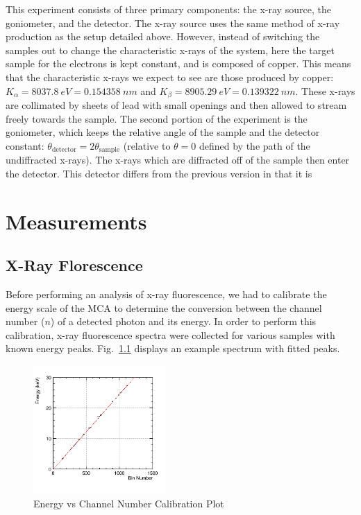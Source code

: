 \documentclass[%
 reprint,
 amsmath,amssymb,
 aps,
 pra,
]{revtex4-1}
\begin{document}
This experiment consists of three primary components: the x-ray source, the goniometer, and the detector. The x-ray source uses the same method of x-ray production as the setup detailed above. However, instead of switching the samples out to change the characteristic x-rays of the system, here the target sample for the electrons is kept constant, and is composed of copper. This means that the characteristic x-rays we expect to see are those produced by copper: $K_\alpha = 8037.8 ~eV= 0.154358 ~nm$ and $K_\beta = 8905.29 ~eV = 0.139322 ~nm$. These x-rays are collimated by sheets of lead with small openings and then allowed to stream freely towards the sample. The second portion of the experiment is the goniometer, which keeps the relative angle of the sample and the detector constant: $\theta_{\text{detector}} = 2\theta_{\text{sample}}$ (relative to $\theta = 0$ defined by the path of the undiffracted x-rays). The x-rays which are diffracted off of the sample then enter the detector. This detector differs from the previous version in that it is 

\section{Measurements}

\subsection{X-Ray Florescence}

Before performing an analysis of x-ray fluorescence, we had to calibrate the energy scale of the MCA to determine the conversion between the channel number ($n$) of a detected photon and its energy. In order to perform this calibration, x-ray fluorescence spectra were collected for various samples with known energy peaks. Fig.~\ref{} displays an example spectrum with fitted peaks.

\begin{figure}[H]
	\centering
	\includegraphics[width=0.45\textwidth]{EvsBin.png}
	\caption{Energy vs Channel Number Calibration Plot}
	\label{Fig:Evsbin}
\end{figure}
\end{document}
